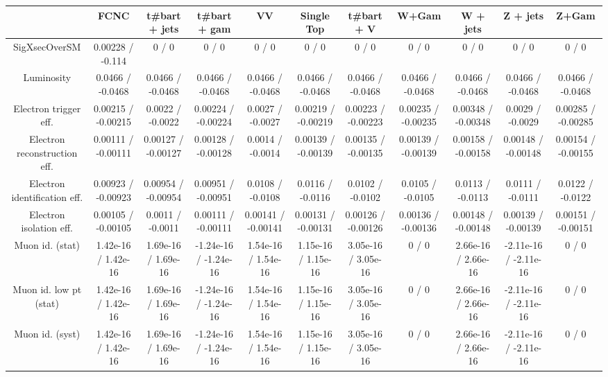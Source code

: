 \begin{table}[htbp]
\begin{center}
\footnotesize
\begin{tabular}{|c|c|c|c|c|c|c|c|c|c|c|}
\hline 
      & FCNC      & t#bar{t} + jets      & t#bar{t} +  gam      & VV      & Single Top      & t#bar{t} + V      & W+Gam      & W + jets      & Z + jets      & Z+Gam \\ 
\hline 
 SigXsecOverSM & 0.00228 / -0.114 & 0 / 0 & 0 / 0 & 0 / 0 & 0 / 0 & 0 / 0 & 0 / 0 & 0 / 0 & 0 / 0 & 0 / 0 \\ 
  Luminosity & 0.0466 / -0.0468 & 0.0466 / -0.0468 & 0.0466 / -0.0468 & 0.0466 / -0.0468 & 0.0466 / -0.0468 & 0.0466 / -0.0468 & 0.0466 / -0.0468 & 0.0466 / -0.0468 & 0.0466 / -0.0468 & 0.0466 / -0.0468 \\ 
  Electron trigger eff. & 0.00215 / -0.00215 & 0.0022 / -0.0022 & 0.00224 / -0.00224 & 0.0027 / -0.0027 & 0.00219 / -0.00219 & 0.00223 / -0.00223 & 0.00235 / -0.00235 & 0.00348 / -0.00348 & 0.0029 / -0.0029 & 0.00285 / -0.00285 \\ 
  Electron reconstruction eff. & 0.00111 / -0.00111 & 0.00127 / -0.00127 & 0.00128 / -0.00128 & 0.0014 / -0.0014 & 0.00139 / -0.00139 & 0.00135 / -0.00135 & 0.00139 / -0.00139 & 0.00158 / -0.00158 & 0.00148 / -0.00148 & 0.00154 / -0.00155 \\ 
  Electron identification eff. & 0.00923 / -0.00923 & 0.00954 / -0.00954 & 0.00951 / -0.00951 & 0.0108 / -0.0108 & 0.0116 / -0.0116 & 0.0102 / -0.0102 & 0.0105 / -0.0105 & 0.0113 / -0.0113 & 0.0111 / -0.0111 & 0.0122 / -0.0122 \\ 
  Electron isolation eff. & 0.00105 / -0.00105 & 0.0011 / -0.0011 & 0.00111 / -0.00111 & 0.00141 / -0.00141 & 0.00131 / -0.00131 & 0.00126 / -0.00126 & 0.00136 / -0.00136 & 0.00148 / -0.00148 & 0.00139 / -0.00139 & 0.00151 / -0.00151 \\ 
  Muon id. (stat) & 1.42e-16 / 1.42e-16 & 1.69e-16 / 1.69e-16 & -1.24e-16 / -1.24e-16 & 1.54e-16 / 1.54e-16 & 1.15e-16 / 1.15e-16 & 3.05e-16 / 3.05e-16 & 0 / 0 & 2.66e-16 / 2.66e-16 & -2.11e-16 / -2.11e-16 & 0 / 0 \\ 
  Muon id. low pt (stat) & 1.42e-16 / 1.42e-16 & 1.69e-16 / 1.69e-16 & -1.24e-16 / -1.24e-16 & 1.54e-16 / 1.54e-16 & 1.15e-16 / 1.15e-16 & 3.05e-16 / 3.05e-16 & 0 / 0 & 2.66e-16 / 2.66e-16 & -2.11e-16 / -2.11e-16 & 0 / 0 \\ 
  Muon id. (syst) & 1.42e-16 / 1.42e-16 & 1.69e-16 / 1.69e-16 & -1.24e-16 / -1.24e-16 & 1.54e-16 / 1.54e-16 & 1.15e-16 / 1.15e-16 & 3.05e-16 / 3.05e-16 & 0 / 0 & 2.66e-16 / 2.66e-16 & -2.11e-16 / -2.11e-16 & 0 / 0 \\ 

\end{tabular}
\end{center}
\end{table}
